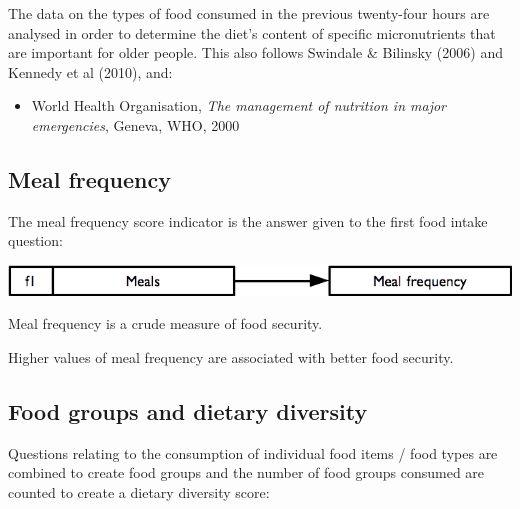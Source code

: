 \documentclass[12pt,a4paper]{book}
\providecommand{\tightlist}{%
  \setlength{\itemsep}{0pt}\setlength{\parskip}{0pt}}
\theoremstyle{definition}
\theoremstyle{definition}
\theoremstyle{definition}
\theoremstyle{remark}
\begin{document}
The data on the types of food consumed in the previous twenty-four hours
are analysed in order to determine the diet's content of specific
micronutrients that are important for older people. This also follows
Swindale \& Bilinsky (2006) and Kennedy et al (2010), and:

\begin{itemize}
\tightlist
\item
  World Health Organisation, \emph{The management of nutrition in major
  emergencies}, Geneva, WHO, 2000
\end{itemize}

\hypertarget{meal-frequency}{%
\subsection{Meal frequency}\label{meal-frequency}}

The meal frequency score indicator is the answer given to the first food
intake question:

\begin{center}\includegraphics{figures/indicators05} \end{center}

Meal frequency is a crude measure of food security.

Higher values of meal frequency are associated with better food
security.

\hypertarget{food-groups-and-dietary-diversity}{%
\subsection{Food groups and dietary
diversity}\label{food-groups-and-dietary-diversity}}

Questions relating to the consumption of individual food items / food
types are combined to create food groups and the number of food groups
consumed are counted to create a dietary diversity score:
\end{document}
